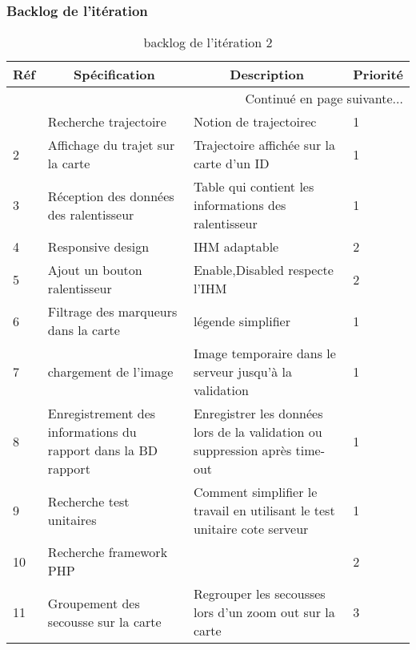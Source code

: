   \subsubsection{Backlog de l'itération}
 \begin{center}
    \footnotesize
    \begin{longtable}{| p{1cm} | p{5cm} | p{7cm} | p{1cm} |}
        \caption{backlog de l'itération 2}
        \label{tab:sprint2-backlog} \\

 \hline
 \multicolumn{1}{|c}{\textbf{Réf}} &
 \multicolumn{1}{|c}{\textbf{Spécification}} &
 \multicolumn{1}{|c}{\textbf{Description}} &
 \multicolumn{1}{|c|}{\textbf{Priorité}} \\ \hline
 \endhead

 \hline \multicolumn{4}{|r|}{{Continué en page suivante$\dotsc$}} \\ \hline
 \endfoot

 \hline \hline
 \endlastfoot

\hline
1 & Recherche trajectoire & Notion de trajectoirec & 1 \\ \hline
2 & Affichage du trajet sur la carte&Trajectoire affichée sur la carte d'un ID  & 1 \\ \hline
3 &Réception des données des ralentisseur &Table qui contient les informations des ralentisseur & 1 \\ \hline
4&Responsive design& IHM adaptable & 2 \\ \hline
5 & Ajout un bouton ralentisseur &Enable,Disabled respecte l'IHM  & 2 \\ \hline
6 & Filtrage des marqueurs dans la carte & légende simplifier & 1 \\ \hline
7 & chargement de l'image & Image temporaire dans le serveur jusqu'à la validation & 1 \\ \hline
8 & Enregistrement des informations du rapport dans la BD rapport& Enregistrer les données lors de la validation ou suppression après time-out & 1 \\ \hline
9 & Recherche test unitaires & Comment simplifier le travail en utilisant le test unitaire cote serveur  & 1 \\ \hline
10 & Recherche framework PHP & & 2 \\ \hline 
11 &Groupement des secousse sur la carte & Regrouper les secousses lors d'un zoom out sur la carte & 3 \\ \hline
\end{longtable}
\end{center}

